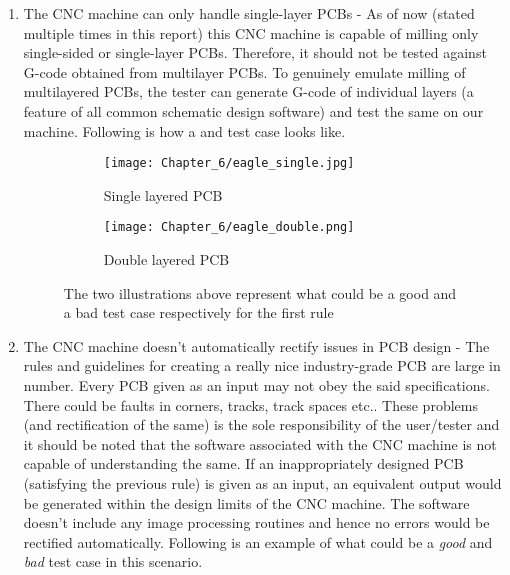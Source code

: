 \begin{enumerate}
 \item The CNC machine can only handle single-layer PCBs - As of now (stated multiple times in this report) this CNC machine is capable of milling only single-sided or single-layer PCBs. Therefore, it should not be tested against G-code obtained from multilayer PCBs. To genuinely emulate milling of multilayered PCBs, the tester can generate G-code of individual layers (a feature of all common schematic design software) and test the same on our machine. Following is how a  and  test case looks like.

       \begin{figure}[h]

        \begin{subfigure}{0.5\textwidth}
         \hspace{8mm}
         \texttt{[image: Chapter\_6/eagle\_single.jpg]}
         \caption{Single layered PCB}
         \label{fig:slpcb}
        \end{subfigure}
        \begin{subfigure}{0.5\textwidth}
         \hspace{8mm}
         \texttt{[image: Chapter\_6/eagle\_double.png]}
         \caption{Double layered PCB}
         \label{fig:dlpcb}
        \end{subfigure}

        \caption{The two illustrations above represent what could be a good and a bad test case respectively for the first rule}
        \label{fig:sl_dl_pcb}
       \end{figure}

 \item The CNC machine doesn’t automatically rectify issues in PCB design - The rules and guidelines for creating a really nice industry-grade PCB are large in number. Every PCB given as an input may not obey the said specifications. There could be faults in corners, tracks, track spaces etc.. These problems (and rectification of the same) is the sole responsibility of the user/tester and it should be noted that the software associated with the CNC machine is not capable of understanding the same. If an inappropriately designed PCB (satisfying the previous rule) is given as an input, an equivalent output would be generated within the design limits of the CNC machine. The software doesn’t include any image processing routines and hence no errors would be rectified automatically. Following is an example of what could be a \textit{good} and \textit{bad} test case in this scenario.


\end{enumerate}
